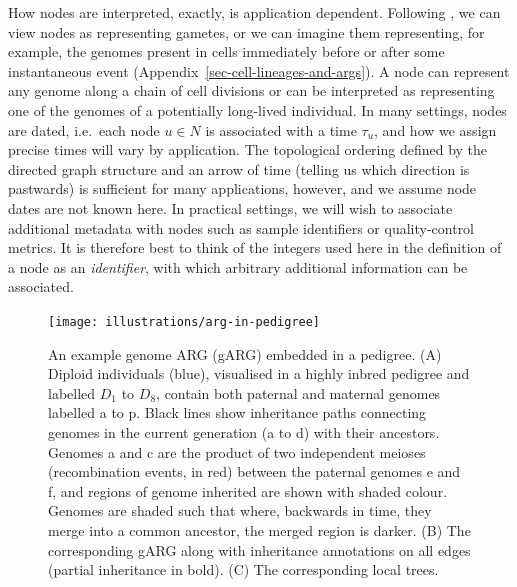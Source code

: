 \documentclass{article}
\newcommand{\noderef}[1]{\textsf{#1}}
\begin{document}
How nodes are interpreted, exactly, is application dependent.
Following \citet{hudson1983properties}, we can view nodes
as representing gametes, or we can imagine them representing,
for example, the genomes present in cells immediately before or after
some instantaneous event (Appendix~\ref{sec-cell-lineages-and-args}).
A node can represent any genome along a chain of cell divisions
or can be interpreted as representing one of the genomes of a
potentially long-lived individual.
In many settings, nodes are dated, i.e.\ each
node $u\in N$ is associated with a time $\tau_u$,
and how we assign precise times will vary by application.
The topological ordering defined by the directed graph structure
and an arrow of time (telling us which direction is pastwards)
is sufficient for many applications, however,
and we assume node dates are not known here.
In practical settings, we will wish to associate additional
metadata with nodes such as sample identifiers or quality-control metrics.
It is therefore best to think of the
integers used here in the definition of a node as an \emph{identifier},
with which arbitrary additional information can be associated.

\begin{figure}
\begin{center}
    \texttt{[image: illustrations/arg-in-pedigree]}
\end{center}
\caption{\label{fig-arg-in-pedigree}
An example genome ARG (gARG) embedded in a pedigree.
(A) Diploid individuals (blue), visualised in a highly inbred pedigree and
labelled $D_1$ to $D_8$,
contain both paternal and maternal  genomes
labelled \noderef{a} to \noderef{p}. Black lines show inheritance paths connecting
genomes in the current generation (\noderef{a} to \noderef{d}) with their ancestors.
Genomes \noderef{a} and \noderef{c} are the product of two independent
meioses (recombination events, in red) between
the paternal genomes \noderef{e}
and \noderef{f}, and regions of genome inherited are shown with shaded colour.
Genomes are shaded such that where, backwards in time,
they merge into a common ancestor, the merged region is darker.
(B) The corresponding gARG along with inheritance annotations on all edges
(partial inheritance in bold).
(C) The corresponding local trees.
}
\end{figure}
\end{document}
